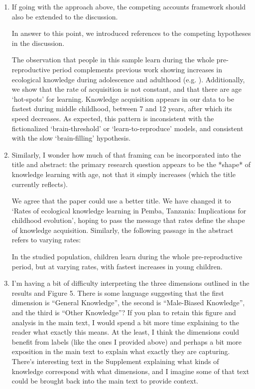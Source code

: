 \documentclass{article}
\newcommand{\rev}[1]{{\color{Red}#1}}
\newcommand{\comment}[1]{{\color{Blue}#1}}
\begin{document}
\begin{enumerate}
    \item If going with the approach above, the competing accounts framework should also be extended to the discussion.
    
    \comment{In answer to this point, we introduced references to the competing hypotheses in the discussion.}
    
    \rev{The observation that people in this sample learn during the whole pre-reproductive period complements previous work showing increases in ecological knowledge during adolescence and adulthood  (e.g. \citealp{Koster2016WisdomLifespan, Schniter2021Age-AppropriateChoyeros}). Additionally, we show that the rate of acquisition is not constant, and that there are age `hot-spots' for learning. Knowledge acquisition appears in our data to be fastest during middle childhood, between 7 and 12 years, after which its speed decreases. As expected, this pattern is inconsistent with the fictionalized `brain-threshold' or `learn-to-reproduce' models, and consistent with the slow `brain-filling' hypothesis}.

    \item Similarly, I wonder how much of that framing can be incorporated into the title and abstract: the primary research question appears to be the *shape* of knowledge learning with age, not that it simply increases (which the title currently reflects).
    
    \comment{We agree that the paper could use a better title. We have changed it to `Rates of ecological knowledge learning in Pemba, Tanzania: Implications for childhood evolution', hoping to pass the message that rates define the shape of knowledge acquisition. Similarly, the following passage in the abstract refers to varying rates:}
    
    \rev{In the studied population, children learn during the whole pre-reproductive period, but at varying rates, with fastest increases in young children.}

    \item I’m having a bit of difficulty interpreting the three dimensions outlined in the results and Figure 5. There is some language suggesting that the first dimension is “General Knowledge”, the second is “Male-Biased Knowledge”, and the third is “Other Knowledge”? If you plan to retain this figure and analysis in the main text, I would spend a bit more time explaining to the reader what exactly this means. At the least, I think the dimensions could benefit from labels (like the ones I provided above) and perhaps a bit more exposition in the main text to explain what exactly they are capturing. There’s interesting text in the Supplement explaining what kinds of knowledge correspond with what dimensions, and I imagine some of that text could be brought back into the main text to provide context.
    

\end{enumerate}
\end{document}
